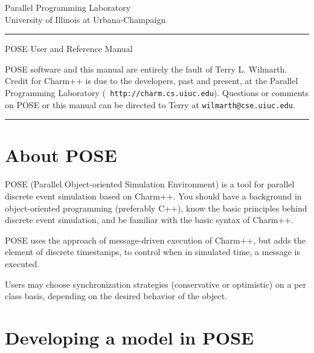 \documentclass[10pt]{article}
\begin{document}
\begin{titlepage}
 \begin{flushright}
   {\Large
     Parallel Programming Laboratory\\
     University of Illinois at Urbana-Champaign\\
   }
 \end{flushright}
 \rule{\textwidth}{3pt}
 \vspace{\fill}
 \begin{flushright}
   \textsf{\Huge POSE User and Reference Manual \\}
 \end{flushright}
 \vspace{\fill}
 {\small POSE software and this manual are entirely the fault of Terry
L. Wilmarth.  Credit for Charm++ is due to the developers, past and
present, at the Parallel Programming Laboratory ({\tt
http://charm.cs.uiuc.edu}).  Questions or comments on POSE or this
manual can be directed to Terry at {\tt wilmarth@cse.uiuc.edu}.
} \\
 \rule{\textwidth}{3pt}
\end{titlepage}

\tableofcontents
\newpage


\section{About POSE}

POSE (Parallel Object-oriented Simulation Environment) is a tool for
parallel discrete event simulation based on Charm++.  You should have
a background in object-oriented programming (preferably C++), know the
basic principles behind discrete event simulation, and be familiar
with the basic syntax of Charm++.  

POSE uses the approach of message-driven execution of Charm++, but
adds the element of discrete timestamps, to control when in simulated
time, a message is executed.

Users may choose synchronization strategies (conservative or
optimistic) on a per class basis, depending on the desired behavior of
the object. 


\section{Developing a model in POSE}
\end{document}
